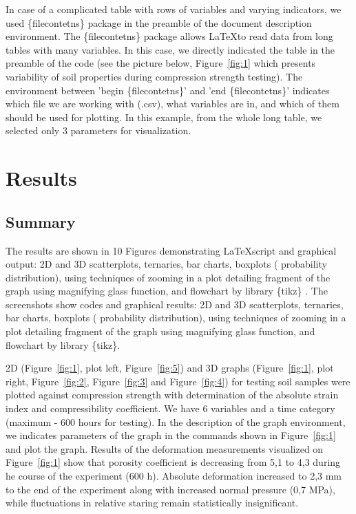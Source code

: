 \documentclass[a4paper,10pt]{article}
\begin{document}
In case of a complicated table with rows of variables and varying indicators, we used \{filecontetns\} package in the preamble of the document description environment. The \{filecontetns\} package allows \LaTeX\space to read data from long tables with many variables. In this case, we directly indicated the table in the preamble of the code (see the picture below, Figure~\ref{fig:1} which presents variability of soil properties during compression strength testing). The environment between 'begin \{filecontetns\}' and 'end \{filecontetns\}' indicates which file we are working with (.csv), what variables are in, and which of them should be used for plotting. In this example, from the whole long table, we selected only 3 parameters for visualization. 

\section{Results}

\subsection{Summary}
The results are shown in 10 Figures demonstrating \LaTeX \space script and graphical output: 2D and 3D scatterplots, ternaries, bar charts, boxplots ( probability distribution), using techniques of zooming in a plot detailing fragment of the graph using magnifying glass function, and flowchart by library \{tikz\} \cite{Tantau}. The screenshots show codes and graphical results: 2D and 3D scatterplots, ternaries, bar charts, boxplots ( probability distribution), using techniques of zooming in a plot detailing fragment of the graph using magnifying glass function, and flowchart by library \{tikz\}.

2D (Figure~\ref{fig:1}, plot left, Figure~\ref{fig:5}) and 3D graphs (Figure~\ref{fig:1}, plot right, Figure~\ref{fig:2}, Figure~\ref{fig:3} and Figure~\ref{fig:4}) for testing soil samples were plotted against compression strength with determination of the absolute strain index and compressibility coefficient. We have 6 variables and a time category (maximum - 600 hours for testing). In the description of the graph environment, we indicates parameters of the graph in the commands shown in Figure~\ref{fig:1} and plot the graph. Results of the deformation measurements visualized on Figure~\ref{fig:1} show that porosity coefficient is decreasing from 5,1 to 4,3 during he course of the experiment (600 h). Absolute deformation increased to 2,3 mm to the end of the experiment along with increased normal pressure (0,7 MPa), while fluctuations in relative staring remain statistically insignificant. 
\end{document}
